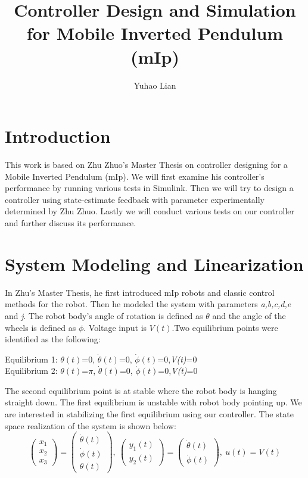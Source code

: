 \documentclass{article}
\title{Controller Design and Simulation for Mobile Inverted Pendulum (mIp)}
\author{Yuhao Lian}
\begin{document}
\maketitle
\section{Introduction}
This work is based on Zhu Zhuo's Master Thesis on controller designing for a Mobile Inverted Pendulum (mIp). We will first examine his controller's performance by running various tests in Simulink. Then we will try to design a controller using state-estimate feedback with parameter experimentally determined by Zhu Zhuo. Lastly we will conduct various tests on our controller and further discuss its performance.
\section{System Modeling and Linearization}
In Zhu's Master Thesis, he first introduced mIp robots and classic control methods for the robot. Then he modeled the system with parameters \textit{a,b,c,d,e} and \textit{j}. The robot body's angle of rotation is defined as $\theta$ and the angle of the wheels is defined as $\phi$. Voltage input is $V(t)$.Two equilibrium points were identified as the following:
\begin{center}
Equilibrium 1: $\theta(t)$=0, $\dot{\theta}(t)$=0, $\dot{\phi}(t)$=0,\textit{V(t)}=0\\
Equilibrium 2: $\theta(t)$=$\pi$, $\dot{\theta}(t)$=0, $\dot{\phi}(t)$=0,\textit{V(t)}=0
\end{center}
The second equilibrium point is at stable where the robot body is hanging straight down. The first equilibrium is unstable with robot body pointing up. We are interested in stabilizing the first equilibrium using our controller. The state space realization of the system is shown below:
$$
\begin{pmatrix}
x_1\\
x_2\\
x_3 
\end{pmatrix}
=
\begin{pmatrix}
\dot{\theta}(t)\\
\dot{\phi}(t)\\
\theta(t)
\end{pmatrix}
,\
\begin{pmatrix}
y_1(t)\\
y_2(t)
\end{pmatrix}
=
\begin{pmatrix}
\dot{\theta}(t)\\
\dot{\phi}(t)
\end{pmatrix}
,\
u(t)=V(t)
$$
\end{document}
